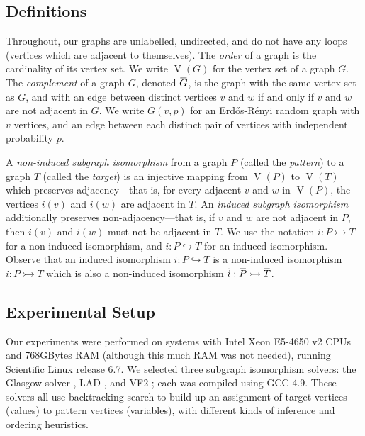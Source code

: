 \documentclass[letterpaper]{article}
\newcommand{\shortoverline}[1]{\mkern 1.5mu\overline{\mkern-1.5mu#1\mkern-1.5mu}\mkern 1.5mu}
\begin{document}
\subsection{Definitions}

Throughout, our graphs are unlabelled, undirected, and do not have any loops (vertices which are
adjacent to themselves).  The \emph{order} of a graph is the cardinality of its vertex set. We write
$\operatorname{V}(G)$ for the vertex set of a graph $G$. The \emph{complement} of a graph $G$,
denoted $\shortoverline{G}$, is the
graph with the same vertex set as $G$, and with an edge between distinct vertices $v$ and $w$ if and
only if
$v$ and $w$ are not adjacent in $G$. We write $G(v, p)$ for an Erd\H{o}s-R\'enyi random graph with
$v$ vertices, and an edge between each distinct pair of vertices with independent probability $p$.

A \emph{non-induced subgraph isomorphism} from a graph $P$ (called the \emph{pattern}) to a graph
$T$ (called the \emph{target}) is an injective mapping from $\operatorname{V}(P)$ to
$\operatorname{V}(T)$ which preserves adjacency---that is, for every adjacent $v$ and $w$ in
$\operatorname{V}(P)$, the vertices $i(v)$ and $i(w)$ are adjacent in $T$. An \emph{induced subgraph
isomorphism} additionally preserves non-adjacency---that is, if $v$ and $w$ are not adjacent in $P$,
then $i(v)$ and $i(w)$ must not be adjacent in $T$. We use the notation $i : P \rightarrowtail T$
for a non-induced isomorphism, and $i : P \hookrightarrow T$ for an induced isomorphism. Observe
that an induced isomorphism $i : P \hookrightarrow T$ is a non-induced isomorphism $i : P
\rightarrowtail T$ which is also a non-induced isomorphism $\shortoverline{i} : \shortoverline{P}
\rightarrowtail \shortoverline{T}$.

\subsection{Experimental Setup}

Our experiments were performed on systems with Intel Xeon E5-4650 v2 CPUs and 768GBytes RAM
(although this much RAM was not needed), running Scientific Linux release 6.7. We selected three
subgraph isomorphism solvers: the Glasgow solver \citep{McCreesh:2015}, LAD \citep{Solnon:2010}, and
VF2 \citep{Cordella:2004}; each was compiled using GCC 4.9. These solvers all use backtracking
search to build up an assignment of target vertices (values) to pattern vertices (variables), with
different kinds of inference and ordering heuristics.
\end{document}
